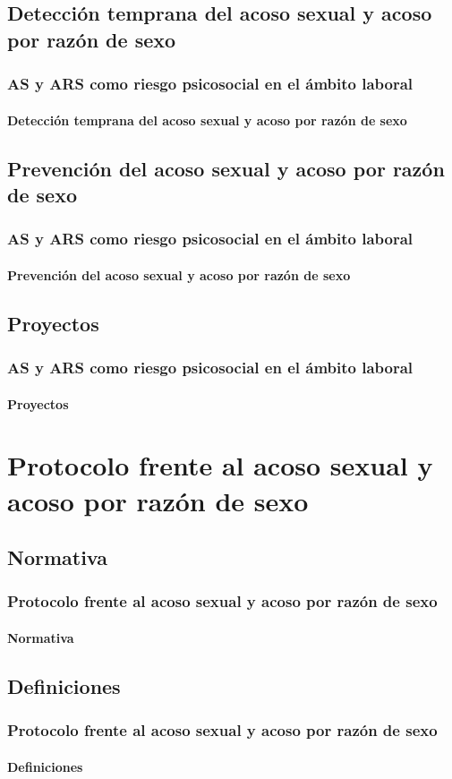 \documentclass{beamer}
\begin{document}
    \subsection{Detección temprana del acoso sexual y acoso por razón de sexo}
    \begin{frame}
		\frametitle{AS y ARS como riesgo psicosocial en el ámbito laboral}
        \framesubtitle{Detección temprana del acoso sexual y acoso por razón de sexo}
	\end{frame}

    \subsection{Prevención del acoso sexual y acoso por razón de sexo}
    \begin{frame}
		\frametitle{AS y ARS como riesgo psicosocial en el ámbito laboral}
        \framesubtitle{Prevención del acoso sexual y acoso por razón de sexo}
	\end{frame}

	\subsection{Proyectos}
    \begin{frame}
		\frametitle{AS y ARS como riesgo psicosocial en el ámbito laboral}
        \framesubtitle{Proyectos}
	\end{frame}

    \section{Protocolo frente al acoso sexual y acoso por razón de sexo}

    \subsection{Normativa}
    \begin{frame}
		\frametitle{Protocolo frente al acoso sexual y acoso por razón de sexo}
        \framesubtitle{Normativa}
	\end{frame}

    \subsection{Definiciones}
    \begin{frame}
		\frametitle{Protocolo frente al acoso sexual y acoso por razón de sexo}
        \framesubtitle{Definiciones}
	\end{frame}
\end{document}

